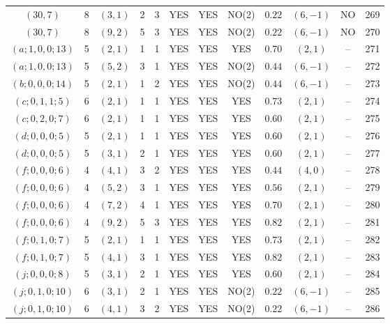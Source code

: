 \begin{longtable}{|c|c|c|c|c|c|c|c|c|c|c|c|}
$(30,7)$ & 8 & $(3,1)$ & 2 & 3 & YES & YES & NO(2) & $0.22$ & $(6,-1)$ & NO & 269\\
$(30,7)$ & 8 & $(9,2)$ & 5 & 3 & YES & YES & NO(2) & $0.22$ & $(6,-1)$ & NO & 270\\
$(a;1,0,0;13)$ & 5 & $(2,1)$ & 1 & 1 & YES & YES & YES & $0.70$ & $(2,1)$ & -- & 271\\
$(a;1,0,0;13)$ & 5 & $(5,2)$ & 3 & 1 & YES & YES & NO(2) & $0.44$ & $(6,-1)$ & -- & 272\\
$(b;0,0,0;14)$ & 5 & $(2,1)$ & 1 & 2 & YES & YES & NO(2) & $0.44$ & $(6,-1)$ & -- & 273\\
$(c;0,1,1;5)$ & 6 & $(2,1)$ & 1 & 1 & YES & YES & YES & $0.73$ & $(2,1)$ & -- & 274\\
$(c;0,2,0;7)$ & 6 & $(2,1)$ & 1 & 1 & YES & YES & YES & $0.60$ & $(2,1)$ & -- & 275\\
$(d;0,0,0;5)$ & 5 & $(2,1)$ & 1 & 1 & YES & YES & YES & $0.60$ & $(2,1)$ & -- & 276\\
$(d;0,0,0;5)$ & 5 & $(3,1)$ & 2 & 1 & YES & YES & YES & $0.60$ & $(2,1)$ & -- & 277\\
$(f;0,0,0;6)$ & 4 & $(4,1)$ & 3 & 2 & YES & YES & YES & $0.44$ & $(4,0)$ & -- & 278\\
$(f;0,0,0;6)$ & 4 & $(5,2)$ & 3 & 1 & YES & YES & YES & $0.56$ & $(2,1)$ & -- & 279\\
$(f;0,0,0;6)$ & 4 & $(7,2)$ & 4 & 1 & YES & YES & YES & $0.70$ & $(2,1)$ & -- & 280\\
$(f;0,0,0;6)$ & 4 & $(9,2)$ & 5 & 3 & YES & YES & YES & $0.82$ & $(2,1)$ & -- & 281\\
$(f;0,1,0;7)$ & 5 & $(2,1)$ & 1 & 1 & YES & YES & YES & $0.73$ & $(2,1)$ & -- & 282\\
$(f;0,1,0;7)$ & 5 & $(4,1)$ & 3 & 1 & YES & YES & YES & $0.82$ & $(2,1)$ & -- & 283\\
$(j;0,0,0;8)$ & 5 & $(3,1)$ & 2 & 1 & YES & YES & YES & $0.60$ & $(2,1)$ & -- & 284\\
$(j;0,1,0;10)$ & 6 & $(3,1)$ & 2 & 1 & YES & YES & NO(2) & $0.22$ & $(6,-1)$ & -- & 285\\
$(j;0,1,0;10)$ & 6 & $(4,1)$ & 3 & 2 & YES & YES & NO(2) & $0.22$ & $(6,-1)$ & -- & 286
\end{longtable}
